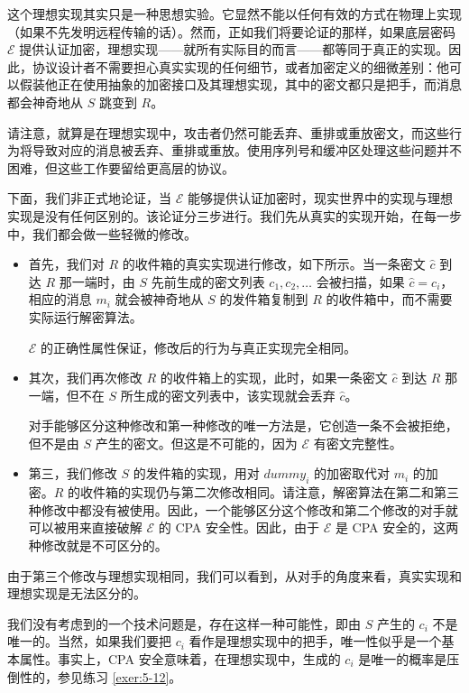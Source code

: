 这个理想实现其实只是一种思想实验。它显然不能以任何有效的方式在物理上实现（如果不先发明远程传输的话）。然而，正如我们将要论证的那样，如果底层密码 $\mathcal{E}$ 提供认证加密，理想实现——就所有实际目的而言——都等同于真正的实现。因此，协议设计者不需要担心真实实现的任何细节，或者加密定义的细微差别：他可以假装他正在使用抽象的加密接口及其理想实现，其中的密文都只是把手，而消息都会神奇地从 $S$ 跳变到 $R$。

请注意，就算是在理想实现中，攻击者仍然可能丢弃、重排或重放密文，而这些行为将导致对应的消息被丢弃、重排或重放。使用序列号和缓冲区处理这些问题并不困难，但这些工作要留给更高层的协议。

\vspace*{10pt}

下面，我们非正式地论证，当 $\mathcal{E}$ 能够提供认证加密时，现实世界中的实现与理想实现是没有任何区别的。该论证分三步进行。我们先从真实的实现开始，在每一步中，我们都会做一些轻微的修改。
\begin{itemize}
	\item 首先，我们对 $R$ 的收件箱的真实实现进行修改，如下所示。当一条密文 $\hat{c}$ 到达 $R$ 那一端时，由 $S$ 先前生成的密文列表 $c_1,c_2,\dots$ 会被扫描，如果 $\hat{c}=c_i$，相应的消息 $m_i$ 就会被神奇地从 $S$ 的发件箱复制到 $R$ 的收件箱中，而不需要实际运行解密算法。
	
	$\mathcal{E}$ 的正确性属性保证，修改后的行为与真正实现完全相同。
	\item 其次，我们再次修改 $R$ 的收件箱上的实现，此时，如果一条密文 $\hat{c}$ 到达 $R$ 那一端，但不在 $S$ 所生成的密文列表中，该实现就会丢弃 $\hat{c}$。
	
	对手能够区分这种修改和第一种修改的唯一方法是，它创造一条不会被拒绝，但不是由 $S$ 产生的密文。但这是不可能的，因为 $\mathcal{E}$ 有密文完整性。
	\item 第三，我们修改 $S$ 的发件箱的实现，用对 $\mathit{dummy}_i$ 的加密取代对 $m_i$ 的加密。$R$ 的收件箱的实现仍与第二次修改相同。请注意，解密算法在第二和第三种修改中都没有被使用。因此，一个能够区分这个修改和第二个修改的对手就可以被用来直接破解 $\mathcal{E}$ 的 CPA 安全性。因此，由于 $\mathcal{E}$ 是 CPA 安全的，这两种修改就是不可区分的。
\end{itemize}

由于第三个修改与理想实现相同，我们可以看到，从对手的角度来看，真实实现和理想实现是无法区分的。

我们没有考虑到的一个技术问题是，存在这样一种可能性，即由 $S$ 产生的 $c_i$ 不是唯一的。当然，如果我们要把 $c_i$ 看作是理想实现中的把手，唯一性似乎是一个基本属性。事实上，CPA 安全意味着，在理想实现中，生成的 $c_i$ 是唯一的概率是压倒性的，参见练习 \ref{exer:5-12}。